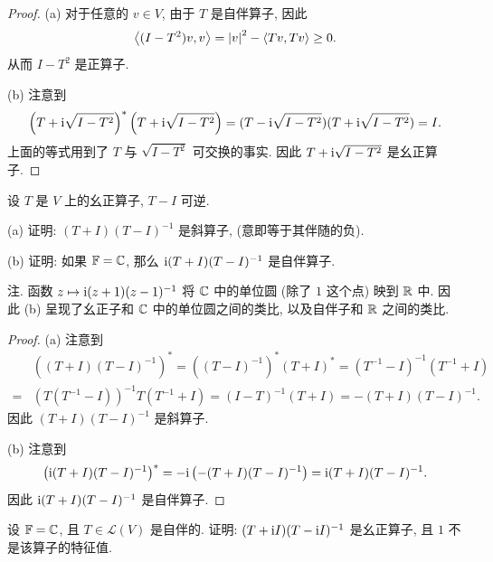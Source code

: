 \documentclass{article}
\begin{document}
\begin{proof}
  (a) 对于任意的 \( v\in V \), 由于 \( T \) 是自伴算子, 因此
  \[ \left\langle (I-T^2)v, v \right\rangle=\left|v\right|^2-\left\langle Tv, Tv \right\rangle\ge 0. \]
  从而 \( I-T^2 \) 是正算子.\par
  (b) 注意到
  \[ \left( T+\mathrm{i}\sqrt{I-T^2} \right)^*\left( T+\mathrm{i}\sqrt{I-T^2} \right)=(T-\mathrm{i}\sqrt{I-T^2})(T+\mathrm{i}\sqrt{I-T^2})=I. \]
  上面的等式用到了 \( T \) 与 \( \sqrt{I-T^2} \) 可交换的事实. 因此 \( T+\mathrm{i}\sqrt{I-T^2} \) 是幺正算子.
\end{proof}



\begin{problem}[7D-15]
设 $T$ 是 $V$ 上的幺正算子, $T - I$ 可逆.

(a) 证明: $(T + I)(T - I)^{-1}$ 是斜算子, (意即等于其伴随的负).

(b) 证明: 如果 $\mathbb{F} = \mathbb{C}$, 那么 $\mathrm{i}(T + I)(T - I)^{-1}$ 是自伴算子.

{\heiti 注.} 函数 $z \mapsto \mathrm{i}(z + 1)(z - 1)^{-1}$ 将 $\mathbb{C}$ 中的单位圆 (除了 $1$ 这个点) 映到 $\mathbb{R}$ 中. 因此 (b) 呈现了幺正子和 $\mathbb{C}$ 中的单位圆之间的类比, 以及自伴子和 $\mathbb{R}$ 之间的类比.
\end{problem}

\begin{proof}
  (a) 注意到
  \begin{align*}
    &\left( (T+I)(T-I)^{-1} \right)^* 
    = ((T-I)^{-1})^*(T+I)^* 
    = (T^{-1}-I)^{-1}(T^{-1}+I) \\
    =& (T(T^{-1}-I))^{-1}T(T^{-1}+I) 
    = (I-T)^{-1}(T+I) 
    = -(T+I)(T-I)^{-1}.
  \end{align*}
  因此 \( (T+I)(T-I)^{-1} \) 是斜算子.\par
  (b) 注意到
  \[ \left( \mathrm{i}(T+I)(T-I)^{-1} \right)^* 
  = -\mathrm{i} \left( -(T+I)(T-I)^{-1} \right)
  = \mathrm{i}(T+I)(T-I)^{-1}. \]
  因此 \( \mathrm{i}(T+I)(T-I)^{-1} \) 是自伴算子.
\end{proof}



\begin{problem}[7D-16]
设 $\mathbb{F} = \mathbb{C}$, 且 $T \in \mathcal{L}(V)$ 是自伴的. 证明: $(T + \mathrm{i} I)(T - \mathrm{i} I)^{-1}$ 是幺正算子, 且 $1$ 不是该算子的特征值.
\end{problem}
\end{document}
